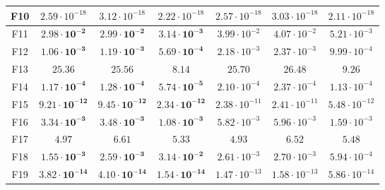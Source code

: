 \begin{table}[!t]
\begin{scriptsize}
\begin{tabular}{c || c c c | c c c }
F10 & $2.59 \cdot 10^{-18}$          & $3.12 \cdot 10^{-18}$            & $2.22 \cdot 10^{-18}$            & $2.57 \cdot 10^{-18}$ & $3.03 \cdot 10^{-18}$ & $2.11 \cdot 10^{-18}$ \\ \hline
F11 & $\mathbf{2.98 \cdot 10^{-2}}$  & $\mathbf{2.99 \cdot 10^{-2}}$    & $\mathbf{3.14 \cdot 10^{-3}}$    & $3.99 \cdot 10^{-2}$  & $4.07 \cdot 10^{-2}$  & $5.21 \cdot 10^{-3}$  \\ \hline
F12 & $\mathbf{1.06 \cdot 10^{-3}}$  & $\mathbf{1.19 \cdot 10^{-3}}$    & $\mathbf{5.69 \cdot 10^{-4}}$    & $2.18 \cdot 10^{-3}$  & $2.37 \cdot 10^{-3}$  & $9.99 \cdot 10^{-4}$  \\ \hline
F13 & $25.36$                        & $25.56$                          & $8.14$                           & $25.70$               & $26.48$               & $9.26$                \\ \hline
F14 & $\mathbf{1.17 \cdot 10^{-4}}$  & $\mathbf{1.28 \cdot 10^{-4}}$    & $\mathbf{5.74 \cdot 10^{-5}}$    & $2.10 \cdot 10^{-4}$  & $2.37 \cdot 10^{-4}$  & $1.13 \cdot 10^{-4}$  \\ \hline
F15 & $\mathbf{9.21 \cdot 10^{-12}}$ & $\mathbf{9.45 \cdot 10^{-12}}$   & $\mathbf{2.34 \cdot 10^{-12}}$   & $2.38 \cdot 10^{-11}$ & $2.41 \cdot 10^{-11}$ & $5.48 \cdot 10^{-12}$ \\ \hline
F16 & $\mathbf{3.34 \cdot 10^{-3}}$  & $\mathbf{3.48 \cdot 10^{-3}}$    & $\mathbf{1.08 \cdot 10^{-3}}$    & $5.82 \cdot 10^{-3}$  & $5.96 \cdot 10^{-3}$  & $1.59 \cdot 10^{-3}$  \\ \hline
F17 & $4.97$                         & $6.61$                           & $5.33$                           & $4.93$                & $6.52$                & $5.48$                \\ \hline
F18 & $\mathbf{1.55 \cdot 10^{-3}}$  & $\mathbf{2.59 \cdot 10^{-3}}$    & $\mathbf{3.14 \cdot 10^{-2}}$    & $2.61 \cdot 10^{-3}$  & $2.70 \cdot 10^{-3}$  & $5.94 \cdot 10^{-4}$  \\ \hline
F19 & $\mathbf{3.82 \cdot 10^{-14}}$ & $\mathbf{4.10 \cdot 10^{-14}}$   & $\mathbf{1.54 \cdot 10^{-14}}$   & $1.47 \cdot 10^{-13}$ & $1.58 \cdot 10^{-13}$ & $5.86 \cdot 10^{-14}$ \\ \hline
\end{tabular}
\end{scriptsize}
\end{table}

